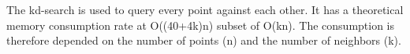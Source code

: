 

The kd-search is used to query every point against each other. It has a theoretical memory consumption rate at O((40+4k)n) subset of O(kn). The consumption is therefore depended on the number of points (n) and the number of neighbors (k).










